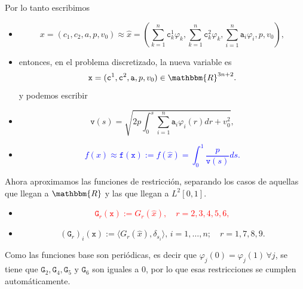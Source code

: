 \documentclass[10pt,mathserif]{beamer}
\newcommand{\R}{\mathbbm{R}}
\begin{document}
\begin{frame}

Por lo tanto escribimos

\begin{itemize}
    \item \textcolor{mymauve}{$$x=(c_1,c_2,a,p,v_0)\approx\hat{x}=\left(\sum_{k=1}^n\texttt{c}^1_k\varphi_k, \sum_{k=1}^n\texttt{c}^2_k\varphi_k,\sum_{i=1}^n\texttt{a}_i\varphi_i, p, v_0\right),$$}
    
    \item entonces, en el problema discretizado, la nueva variable es
    \textcolor{red}{$$\texttt{x}=(\texttt{c}^1,\texttt{c}^2,\texttt{a},p,v_0)\in\R^{3n+2}.$$} y podemos escribir
    \item \textcolor{mygreen}{$$\texttt{v}(s)=\sqrt{2p\int_0^s \sum_{i=1}^n\texttt{a}_i\varphi_i(r)dr +v_0^2},$$}
    \item \textcolor{blue}{$$f(x)\approx\texttt{f}(\texttt{x}):=f(\hat x)=\int_0^1 \frac{p}{\texttt{v}(s)}ds.$$}
    
\end{itemize}

\end{frame}
\begin{frame}

Ahora aproximamos las funciones de restricción, separando los casos de aquellas que llegan a $\R$ y las que llegan a $L^2[0,1]$.
\begin{itemize}
    \item \textcolor{red}{$$\texttt{G}_r(\texttt{x}):=G_r(\hat x),\quad r=2,3,4,5,6,$$}
    \item \textcolor{mygreen}{$$(\texttt{G}_r)_{i}(\texttt{x}):=\langle G_r(\hat x) , \delta_{s_i}\rangle,\,i=1,\ldots,n; \quad r=1,7,8,9.$$}
\end{itemize}

\begin{block}{}
Como las funciones base son periódicas, es decir que $\varphi_j(0)=\varphi_j(1)\, \forall j$, se tiene que $\texttt{G}_2,\texttt{G}_4,\texttt{G}_5\mbox{ y }\texttt{G}_6$ son iguales a 0, por lo que esas restricciones se cumplen automáticamente.
\end{block}
\end{frame}
\end{document}
